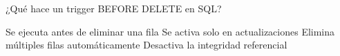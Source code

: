 \question[1] ¿Qué hace un trigger BEFORE DELETE en SQL?
\begin{choices}
\CorrectChoice Se ejecuta antes de eliminar una fila
\choice Se activa solo en actualizaciones
\choice Elimina múltiples filas automáticamente
\choice Desactiva la integridad referencial
\end{choices}